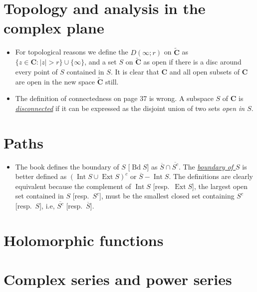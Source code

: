 \documentclass[11pt]{article}
\newcommand{\df}[1]{\ul{\textit{\textsf{#1}}}} %
\newcommand{\C}{\mathbf{C}}
\newcommand{\eC}{\widetilde{\C}}
\newcommand{\Bd}{\operatorname{Bd}}
\newcommand{\clos}[1]{\overline{#1}}
\newcommand{\nm}[1]{\|#1\|}
\newcommand{\abs}[1]{\lvert #1 \rvert}
\begin{document}
\section{Topology and analysis in the complex plane}
\begin{itemize}
    \item For topological reasons we define the $D(\infty; r)$ on $\eC$ as $\{z \in \C : \abs{z} > r\} \cup \{\infty\}$, and a set $S$ on $\eC$ as open if there is a disc around every point of $S$ contained in $S$. It is clear that $\C$ and all open subsets of $\C$ are open in the new space $\eC$ still.
    \item The definition of connectedness on page 37 is wrong. A subspace $S$ of $\C$ is \df{disconnected} if it can be expressed as the disjoint union of two  sets \textit{open in $S$}.
    
\end{itemize}

\section{Paths}
\begin{itemize}
    \item The book defines the boundary of $S$ [$\Bd S$] as $\clos{S} \cap \clos{S^c}$. The \df{boundary of $S$} is better defined as $(\operatorname{Int} S \cup \operatorname{Ext} S)^c$ or $\clos{S}-\operatorname{Int} S$. The definitions are clearly equivalent because the complement of $\operatorname{Int} S$ [resp.\ $\operatorname{Ext} S$], the largest open set contained in $S$ [resp.\ $S^c$], must be the smallest closed set containing $S^c$ [resp.\ $S$], i.e, $\clos{S^c}$ [resp.\ $\clos{S}$].
\end{itemize}

\section{Holomorphic functions}

\section{Complex series and power series}
\end{document}
